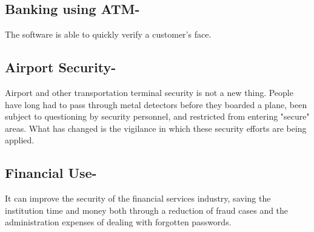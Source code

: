 \subsection{Banking using ATM-}
The software is able to quickly verify a customer’s face.

\subsection{Airport Security-}
Airport and other transportation terminal security is not a new thing. People have long had to pass through metal detectors before they boarded a plane, been subject to questioning by security personnel, and restricted from entering "secure" areas. What has changed is the vigilance in which these security efforts are being applied.

\subsection{Financial Use-}
 It can improve the security of the financial services industry, saving the institution time and money both through a reduction of fraud cases and the administration expenses of dealing with forgotten passwords.



















